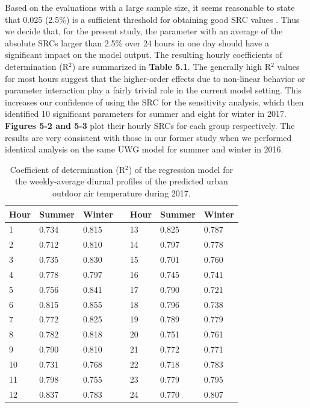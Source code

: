 Based on the evaluations with a large sample size, it seems reasonable to state that 0.025 (2.5\%) is a sufficient threshold for obtaining good SRC values \cite{saltelli2004sensitivity,menberg2016sensitivity}. Thus we decide that, for the present study, the parameter with an average of the absolute SRCs larger than 2.5\% over 24 hours in one day should have a significant impact on the model output. The resulting hourly coefficients of determination (R$^2$) are summarized in \textbf{Table 5.1}. The generally high R$^2$ values for most hours suggest that the higher-order effects due to non-linear behavior or parameter interaction play a fairly trivial role in the current model setting. This increases our confidence of using the SRC for the sensitivity analysis, which then identified 10 significant parameters for summer and eight for winter in 2017. \textbf{Figures 5-2 and 5-3} plot their hourly SRCs for each group respectively. The results are very consistent with those in our former study \cite{mao2017global} when we performed identical analysis on the same UWG model for summer and winter in 2016.

\begin{table}[]
\footnotesize
\centering
\caption{Coefficient of determination (R$^2$) of the regression model for the weekly-average diurnal profiles of the predicted urban outdoor air temperature during 2017.}
\begin{tabular}{lllllll}
\toprule
Hour & Summer & Winter &  & Hour & Summer & Winter \\ \hline
1    & 0.734  & 0.815  &  & 13   & 0.825  & 0.787  \\
2    & 0.712  & 0.810  &  & 14   & 0.797  & 0.778  \\
3    & 0.735  & 0.830  &  & 15   & 0.701  & 0.760  \\
4    & 0.778  & 0.797  &  & 16   & 0.745  & 0.741  \\
5    & 0.756  & 0.841  &  & 17   & 0.790  & 0.721  \\
6    & 0.815  & 0.855  &  & 18   & 0.796  & 0.738  \\
7    & 0.772  & 0.825  &  & 19   & 0.789  & 0.779  \\
8    & 0.782  & 0.818  &  & 20   & 0.751  & 0.761  \\
9    & 0.790  & 0.810  &  & 21   & 0.772  & 0.771  \\
10   & 0.731  & 0.768  &  & 22   & 0.718  & 0.783  \\
11   & 0.798  & 0.755  &  & 23   & 0.779  & 0.795  \\
12   & 0.837  & 0.783  &  & 24   & 0.770  & 0.807  \\
\bottomrule
\end{tabular}
\end{table}

